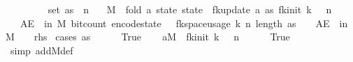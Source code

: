 \begin{isabellebody}
\ \ \ {\isachardoublequoteopen}{\isasymdelta}\ {\isachargreater}{\kern0pt}\ {}{\isachardoublequoteclose}\isanewline
\ \ \ {\isachardoublequoteopen}set\ as\ {\isasymsubseteq}\ {\isacharbraceleft}{\kern0pt}{}{\isachardot}{\kern0pt}{\isachardot}{\kern0pt}{\isacharless}{\kern0pt}n{\isacharbraceright}{\kern0pt}{\isachardoublequoteclose}\isanewline
\ \ \ {\isachardoublequoteopen}M\ {\isasymequiv}\ fold\ {\isacharparenleft}{\kern0pt}{\isasymlambda}a\ state{\isachardot}{\kern0pt}\ state\ {\isasymbind}\ fk{\isacharunderscore}{\kern0pt}update\ a{\isacharparenright}{\kern0pt}\ as\ {\isacharparenleft}{\kern0pt}fk{\isacharunderscore}{\kern0pt}init\ k\ {\isasymdelta}\ {\isasymepsilon}\ n{\isacharparenright}{\kern0pt}{\isachardoublequoteclose}\isanewline
\ \ \ {\isachardoublequoteopen}AE\ {\isasymomega}\ in\ M{\isachardot}{\kern0pt}\ bit{\isacharunderscore}{\kern0pt}count\ {\isacharparenleft}{\kern0pt}encode{\isacharunderscore}{\kern0pt}state\ {\isasymomega}{\isacharparenright}{\kern0pt}\ {\isasymle}\ fk{\isacharunderscore}{\kern0pt}space{\isacharunderscore}{\kern0pt}usage\ {\isacharparenleft}{\kern0pt}k{\isacharcomma}{\kern0pt}\ n{\isacharcomma}{\kern0pt}\ length\ as{\isacharcomma}{\kern0pt}\ {\isasymepsilon}{\isacharcomma}{\kern0pt}\ {\isasymdelta}{\isacharparenright}{\kern0pt}{\isachardoublequoteclose}\ {\isacharparenleft}{\kern0pt}\ {\isachardoublequoteopen}AE\ {\isasymomega}\ in\ M{\isachardot}{\kern0pt}\ {\isacharparenleft}{\kern0pt}{\isacharunderscore}{\kern0pt}\ \ {\isasymle}\ {\isacharquery}{\kern0pt}rhs{\isacharparenright}{\kern0pt}{\isachardoublequoteclose}{\isacharparenright}{\kern0pt}\isanewline
%
\isadelimproof
%
\endisadelimproof
%
\isatagproof
{}\isamarkupfalse%
\ {\isacharparenleft}{\kern0pt}cases\ {\isachardoublequoteopen}as\ {\isacharequal}{\kern0pt}\ {\isacharbrackleft}{\kern0pt}{\isacharbrackright}{\kern0pt}{\isachardoublequoteclose}{\isacharparenright}{\kern0pt}\isanewline
\ \ \isamarkupfalse%
\ True\isanewline
\ \ \isamarkupfalse%
\ a{\isacharcolon}{\kern0pt}{\isachardoublequoteopen}M\ {\isacharequal}{\kern0pt}\ fk{\isacharunderscore}{\kern0pt}init\ k\ {\isasymdelta}\ {\isasymepsilon}\ n{\isachardoublequoteclose}\isanewline
\ \ \ \ \isamarkupfalse%
\ True\ \isamarkupfalse%
\ {\isacharparenleft}{\kern0pt}simp\ add{\isacharcolon}{\kern0pt}M{\isacharunderscore}{\kern0pt}def{\isacharparenright}{\kern0pt}\isanewline
\ \ \isamarkupfalse%

\end{isabellebody}
